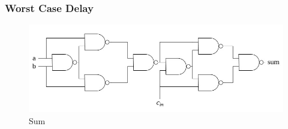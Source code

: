 \documentclass{article}
\begin{document}
\subsubsection*{Worst Case Delay}
\begin{figure}
    \centering
    \includegraphics[width=1\linewidth]{figs/image.png}
    \caption{Sum}
    \label{fig:enter-label}
\end{figure}
\end{document}
